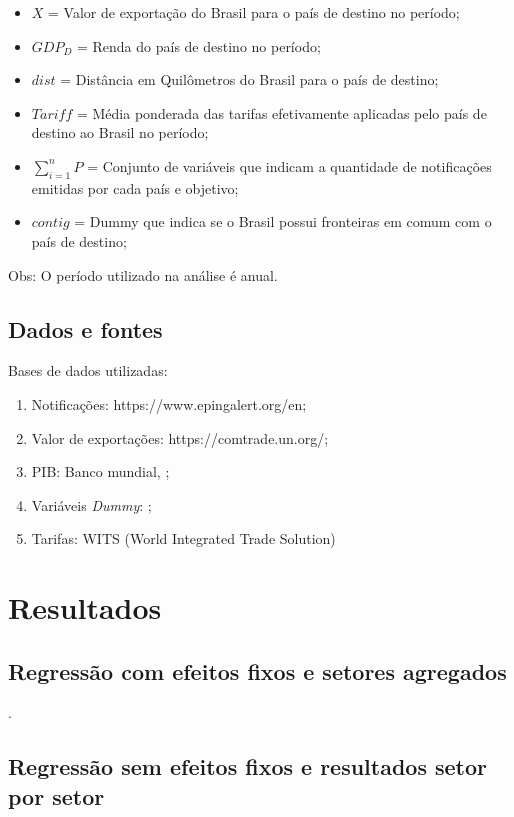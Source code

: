 \documentclass[12pt, a4paper]{article}
\begin{document}
\begin{itemize}
    \item $X$ = Valor de exportação do Brasil para o país de destino no período;
    \item $GDP_{D}$ = Renda do país de destino no período;
    \item $dist$ = Distância em Quilômetros  do Brasil para o país de destino;
    \item $Tariff$ = Média ponderada das tarifas efetivamente aplicadas pelo país de destino ao Brasil no período;
    \item $\sum_{i=1}^{n} P$ = Conjunto de variáveis que indicam a quantidade de notificações emitidas por cada país e objetivo;
    \item $contig$ = Dummy que indica se o Brasil possui fronteiras em comum com o país de destino;
\end{itemize}

Obs: O período utilizado na análise é anual.

\subsection{Dados e fontes}

Bases de dados utilizadas:

\begin{enumerate}
    \item Notificações: https://www.epingalert.org/en;
    \item Valor de exportações: https://comtrade.un.org/;
    \item PIB: Banco mundial, \cite{WB};
    \item Variáveis \emph{Dummy}: \cite{CEPII};
    \item Tarifas: WITS (World Integrated Trade Solution)
\end{enumerate}

\newpage
\section{Resultados}

\subsection{Regressão com efeitos fixos e setores agregados}.



\subsection{Regressão sem efeitos fixos e resultados setor por setor}




\printbibliography
\end{document}
